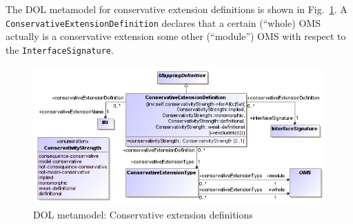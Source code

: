 \documentclass[10pt, a4paper]{isov2}
\newcommand*{\syntax}[1]{\texttt{#1}}
\begin{document}
The DOL metamodel for conservative extension definitions is shown in 
Fig.~\ref{fig:modules}.
A \syntax{ConservativeExtensionDefinition} declares that a certain (``whole) OMS
actually is a conservative extension some other (``module'') OMS with respect
to the \syntax{InterfaceSignature}.


\begin{figure}
  \centering
    \includegraphics[scale=0.47]{mof/modules.png}
  \caption{DOL metamodel: Conservative extension definitions}
  \label{fig:modules}
\end{figure}



\label{a:dol-text:mappings}
\end{document}
